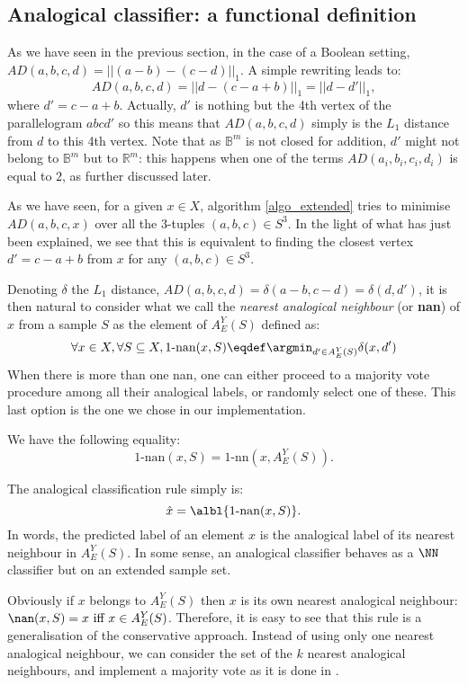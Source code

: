 \documentclass{ecai}
\begin{document}
\subsection{Analogical classifier: a functional definition}\label{FUNCTIONAL_DEF}

As we have seen in the previous section, in the case of a Boolean setting,
$AD(a,b,c,d)= ||(a-b)-(c-d)||_1$.  A simple rewriting leads to:
$$AD(a,b,c,d)=||d - (c-a+b)||_1=||d - d'||_1,$$
where $d'=c-a+b$. Actually, $d'$ is nothing but the 4th vertex of the
parallelogram $abcd'$ so this means that $AD(a,b,c,d)$ simply is the $L_1$ distance
 from $d$ to this 4th vertex. Note that as $\mathbb{B}^m$ is not closed for
addition, $d'$ might not belong to $\mathbb{B}^m$ but to $\mathbb{R}^m$: this
happens when one of the terms $AD(a_i, b_i, c_i, d_i)$ is equal to $2$, as
further discussed later.

As we have seen, for a given $x \in X$, algorithm \ref{algo_extended} tries to
minimise $AD(a,b,c,x)$ over all the 3-tuples $(a,b,c) \in S^3$. In the
light of what has just been explained, we see that this is equivalent to
finding the closest vertex $d'=c-a+b$  from $x$ for any $(a, b, c) \in S^3$.


Denoting $\delta$ the $L_1$ distance, $AD(a,b,c,d) =\delta(a-b,c-d) =
\delta(d,d')$,
it is then natural to consider what we call the \textit{nearest analogical
neighbour} (or \textbf{nan}) of $x$ from a sample $S$ as the element of
$A_E^Y(S)$ defined as:
$$\forall x \in X, \forall S \subseteq X, 1\mbox{-nan}(x,S)\eqdef \argmin_{d'
\in A_E^Y(S)} \delta(x,d')$$
When there is more than one nan, one can either proceed to a majority vote
procedure among all their analogical labels, or randomly select one of these.
This last option is the one we chose in our implementation.
\begin{proper} \label{propnn}We have the following equality:
$$1\mbox{-nan}(x,S)= 1\mbox{-nn}(x,A_E^Y(S)).$$
\end{proper}
The analogical classification rule simply is:
$$\hat{x} = \albl{1\mbox{-nan}(x,S)}.$$
In words, the predicted label of an element $x$ is the analogical label of its
nearest neighbour in $A_E^Y(S)$.
In some sense, an analogical classifier behaves
as a $\NN$ classifier but on an extended sample set.

Obviously if $x$ belongs to $A_E^Y(S)$ then $x$ is its own nearest analogical
neighbour: $\nan(x, S) = x \text{ iff } x \in A_E^Y(S)$. Therefore, it is easy
to see that this rule is a generalisation of the conservative approach.
Instead of using only one nearest analogical neighbour, we can consider the set
of the $k$ nearest analogical neighbours, and implement a majority vote as it is
done in \cite{MicBayDelJAIR2008}.
\end{document}
